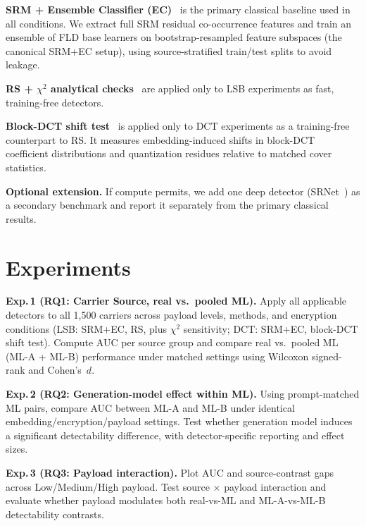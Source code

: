 \documentclass[10pt,twocolumn,a4paper]{article}
\begin{document}
\textbf{SRM + Ensemble Classifier (EC)}~\cite{fridrich2012srm,kodovsky2012ec} is the primary classical baseline used in all conditions. We extract full SRM residual co-occurrence features and train an ensemble of FLD base learners on bootstrap-resampled feature subspaces (the canonical SRM+EC setup), using source-stratified train/test splits to avoid leakage.

\textbf{RS + $\chi^2$ analytical checks}~\cite{fridrich2001lsb,westfeld1999chi} are applied only to LSB experiments as fast, training-free detectors.

\textbf{Block-DCT shift test}~\cite{wangmoulin2003dct} is applied only to DCT experiments as a training-free counterpart to RS. It measures embedding-induced shifts in block-DCT coefficient distributions and quantization residues relative to matched cover statistics.

\textbf{Optional extension.} If compute permits, we add one deep detector (SRNet~\cite{boroumand2019srnet}) as a secondary benchmark and report it separately from the primary classical results.

\section{Experiments}
\label{sec:experiments}

\textbf{Exp.\,1 (RQ1: Carrier Source, real vs.\ pooled ML).} Apply all applicable detectors to all 1{,}500 carriers across payload levels, methods, and encryption conditions (LSB: SRM+EC, RS, plus $\chi^2$ sensitivity; DCT: SRM+EC, block-DCT shift test). Compute AUC per source group and compare real vs.\ pooled ML (ML-A + ML-B) performance under matched settings using Wilcoxon signed-rank and Cohen's~$d$.

\textbf{Exp.\,2 (RQ2: Generation-model effect within ML).} Using prompt-matched ML pairs, compare AUC between ML-A and ML-B under identical embedding/encryption/payload settings. Test whether generation model induces a significant detectability difference, with detector-specific reporting and effect sizes.

\textbf{Exp.\,3 (RQ3: Payload interaction).} Plot AUC and source-contrast gaps across Low/Medium/High payload. Test source $\times$ payload interaction and evaluate whether payload modulates both real-vs-ML and ML-A-vs-ML-B detectability contrasts.
\end{document}
